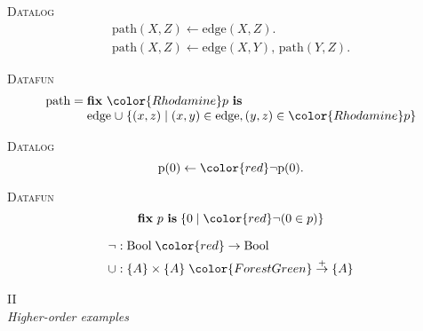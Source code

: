 \documentclass[dvipsnames,fleqn]{beamer}
\providecommand\EMPH\textsc
\let\oldcup\cup
\renewcommand\cup{\mathrel{\oldcup}}
\newcommand\kw\textbf
\newcommand\name\text
\newcommand\tset[1]{\{{#1}\}}
\newcommand\x\times
\newcommand\eset[1]{\{{#1}\}}
\newcommand\esetfor[2]{\eset{{#1} \mathrel{|} {#2}}}
\newcommand\efix[1]{\kw{fix}~{#1}~\kw{is}\;}
\newcommand\efixh[1]{\efix{\hilit #1}}
\newcommand\hilit{\color{Rhodamine}}
\begin{document}


\begin{frame}{}
  \EMPH{Datalog}
  \[
  \begin{array}{l}
    \name{path}(X,Z) \gets \name{edge}(X,Z).\\
    \name{path}(X,Z) \gets \name{edge}(X,Y),\, \name{path}(Y,Z).
  \end{array}
  \]
  \vspace{0pt}

  \EMPH{Datafun}
  \[
  \begin{array}{l}
    \name{path} =
    \efixh{p}\\
    \phantom{\name{path} ={}}
    \name{edge} \cup \esetfor{(x,z)}{(x,y) \in \name{edge}, (y,z) \in \hilit p}
  \end{array}
  \]
\end{frame}


\newcommand\tbool{\text{Bool}}
\newcommand\dto\to
\newcommand\mto{\overset{+}{\to}}

\begin{frame}
  \EMPH{Datalog}
  \[ \name{p}(0) \gets {\color{red}\neg}\name{p}(0).\]

  \EMPH{Datafun}
  \[
  \efix{p} \esetfor{0}{\mathop{\color{red}\neg}(0 \in p)}
  \]

  \begin{ceqn}
    \begin{align*}
    {\neg} &: \tbool \mathrel{\color{red}\dto} \tbool\\
    {\cup} &: \tset{A} \x \tset{A} \mathrel{\color{ForestGreen}\mto} \tset{A}
    \end{align*}
  \end{ceqn}
\end{frame}




\begin{frame}
  \centering\huge
  {II}\\[1ex]
  \emph{Higher-order examples}
\end{frame}
\end{document}

